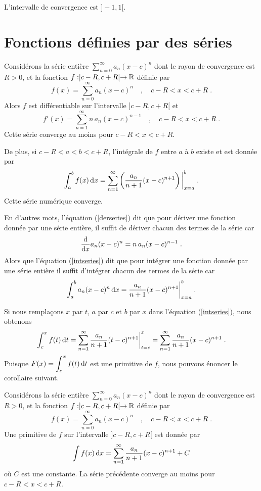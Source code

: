{\begin{egg}
L'intervalle de convergence est $]-1,1[$.
\end{egg}

\section{Fonctions définies par des séries}

\begin{focus}{\thm} \label{der_int_series}
Considérons la série entière $\displaystyle \sum_{n=0}^\infty a_n (x-c)^n$
dont le rayon de convergence est $R>0$, et la fonction
$f:]c-R,c+R[\rightarrow \RR$ définie par
\[
f(x) = \sum_{n=0}^\infty a_n (x-c)^n \quad , \quad c-R<x<c+R \; .
\]
Alors $f$ est différentiable sur l'intervalle $]c-R,c+R[$ et
\begin{equation}\label{derseries}
f'(x) = \sum_{n=1}^\infty n\,a_n (x-c)^{n-1} \quad , \quad c-R<x<c+R \; .
\end{equation}
Cette série converge au moins pour $c-R<x<c+R$.

De plus, si $c-R<a<b<c+R$, l'intégrale de $f$ entre $a$
à $b$ existe et est donnée par
\begin{equation}\label{intseries}
\int_a^b f(x) \dx{x} =
\sum_{n=1}^\infty \left(\frac{a_n}{n+1} (x-c)^{n+1}\right) \bigg|_{x=a}^b \; .
\end{equation}
Cette série numérique converge.
\end{focus}

\begin{rmk}
En d'autres mots, l'équation (\ref{derseries}) dit que pour dériver une
fonction donnée par une série entière, il suffit de dériver chacun des termes
de la série car
\[
\dfdx{a_n (x-c)^n}{x} = n\, a_n (x-c)^{n-1} \; .
\]
Alors que l'équation (\ref{intseries}) dit que pour intégrer
une fonction donnée par une série entière il suffit d'intégrer chacun des
termes de la série car
\[
\int_a^b a_n (x-c)^n \dx{x} 
= \frac{a_n}{n+1} (x-c)^{n+1} \bigg|_{x=a}^b \; .
\]
\end{rmk}

Si nous remplaçons $x$ par $t$, $a$ par $c$ et $b$ par $x$ dans l'équation
(\ref{intseries}), nous obtenons
\[
\int_c^x f(t) \dx{t} =
\sum_{n=1}^\infty \frac{a_n}{n+1} (t-c)^{n+1} \bigg|_{t=c}^x
= \sum_{n=1}^\infty \frac{a_n}{n+1} (x-c)^{n+1} \;.
\]
Puisque $\displaystyle F(x) = \int_c^x f(t) \dx{t}$ est une primitive
de $f$, nous pouvons énoncer le corollaire suivant.

\begin{focus}{\cor}
Considérons la série entière $\displaystyle \sum_{n=0}^\infty a_n (x-c)^n$
dont le rayon de convergence est $R>0$, et la fonction
$f:]c-R,c+R[\rightarrow \RR$ définie par
\[
f(x) = \sum_{n=0}^\infty a_n (x-c)^n \quad , \quad c-R<x<c+R \; .
\]
Une primitive de $f$ sur l'intervalle $]c-R,c+R[$ est donnée
par
\[
\int f(x) \dx{x} = \sum_{n=1}^\infty \frac{a_n}{n+1} (x-c)^{n+1} +C
\]
où $C$ est une constante.  La série précédente converge au moins pour
$c-R<x<c+R$.
\end{focus}

}
